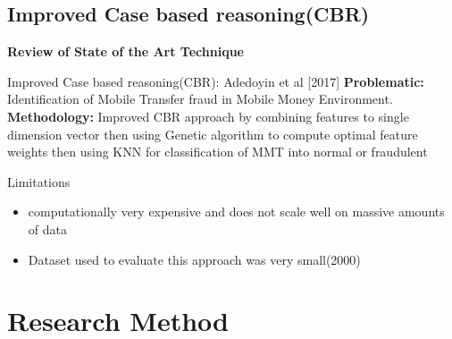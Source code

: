 \documentclass[11pt,aspectratio=169]{beamer}
\begin{document}
\subsection{Improved Case based reasoning(CBR)}
	\begin{frame}{\small{\textbf{ Review of State of the Art Technique}}}
		\begin{block}{Improved Case based reasoning(CBR): Adedoyin et al [2017]}
			\textbf{Problematic:} 
			Identification of Mobile Transfer fraud in Mobile Money Environment.\\
			
			\textbf{Methodology:} 
			Improved CBR approach by combining features to single dimension vector then using Genetic algorithm to compute optimal feature weights then using KNN for classification of MMT into normal or fraudulent
			
			
		\end{block}
		
			\begin{block}{ Limitations}
				\begin{itemize}
					\item computationally very expensive and does not scale well on massive amounts of data
					\item Dataset used to evaluate this approach was very small(2000)
				
				\end{itemize}
			\end{block}
	
		
	\end{frame}
	
	
	\section{Research Method}
\end{document}

